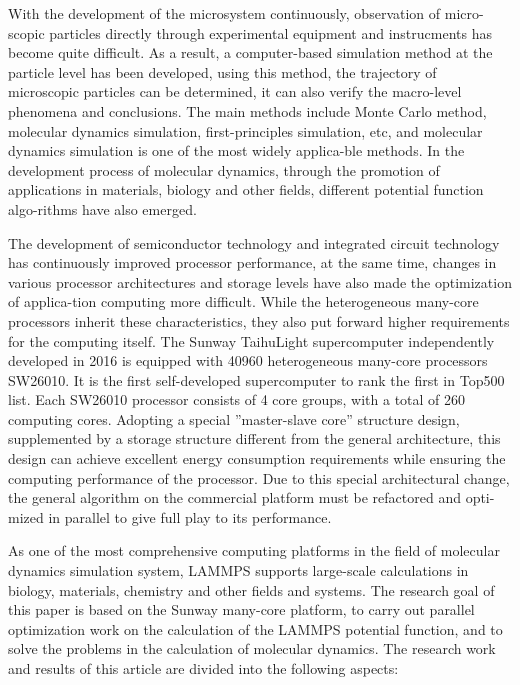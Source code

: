 \begin{abstract*}
With the development of the microsystem continuously, observation of micro-scopic particles directly through experimental equipment and instrucments has become quite difficult. As a result, a computer-based simulation method at the particle level has been developed, using this method, the trajectory of microscopic particles can be determined, it can also verify the macro-level phenomena and conclusions. The main methods include Monte Carlo method, molecular dynamics simulation, first-principles simulation, etc, and molecular dynamics simulation is one of the most widely applica-ble methods. In the development process of molecular dynamics, through the promotion of applications in materials, biology and other fields, different potential function algo-rithms have also emerged.

The development of semiconductor technology and integrated circuit technology has continuously improved processor performance, at the same time, changes in various processor architectures and storage levels have also made the optimization of applica-tion computing more difficult. While the heterogeneous many-core processors inherit these characteristics, they also put forward higher requirements for the computing itself. The Sunway TaihuLight supercomputer independently developed in 2016 is equipped with 40960 heterogeneous many-core processors SW26010. It is the first self-developed supercomputer to rank the first in Top500 list. Each SW26010 processor consists of 4 core groups, with a total of 260 computing cores. Adopting a special ”master-slave core” structure design, supplemented by a storage structure different from the general architecture, this design can achieve excellent energy consumption requirements while ensuring the computing performance of the processor. Due to this special architectural change, the general algorithm on the commercial platform must be refactored and opti-mized in parallel to give full play to its performance.

As one of the most comprehensive computing platforms in the field of molecular dynamics simulation system, LAMMPS supports large-scale calculations in biology, materials, chemistry and other fields and systems. The research goal of this paper is based on the Sunway many-core platform, to carry out parallel optimization work on the calculation of the LAMMPS potential function, and to solve the problems in the calculation of molecular dynamics. The research work and results of this article are divided into the following aspects:


\end{abstract*}
